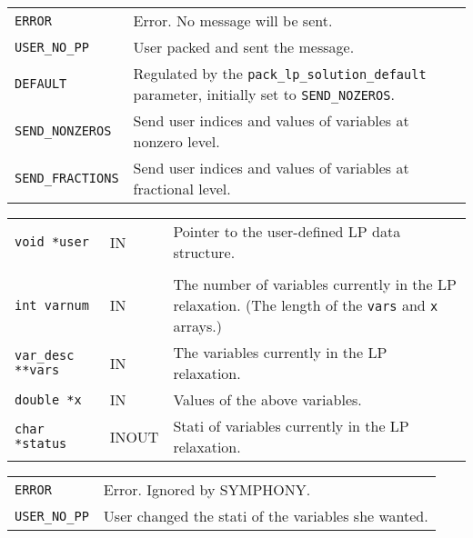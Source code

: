 \documentclass[twoside,11pt]{article}
\begin{document}
{\newpage
\clearpage
\samepage \begin{tabular}{lp{348.725pt}}
{\tt ERROR} & Error. No message will be sent. \\ 
{\tt USER\_NO\_PP} & User packed and sent the message. \\ 
{\tt DEFAULT} & Regulated by the {\tt pack\_lp\_solution\_default}
parameter, initially set to {\tt SEND\_NOZEROS}. \\ 
{\tt SEND\_NONZEROS} & Send user indices and values of variables
at nonzero level.\\ 
{\tt SEND\_FRACTIONS} & Send user indices and values of variables
at fractional level.\\ 
\end{tabular}
}

{\newpage
\clearpage
\samepage \begin{tabular}{llp{297.864pt}}
{\tt void *user} &  IN & Pointer to the user-defined LP data structure. \\ 
& & \\ 
{\tt int varnum} & IN & The number of variables currently in the LP
relaxation. (The length of the {\tt *vars} and {\tt x} arrays.) \\ 
{\tt var\_desc **vars} & IN & The variables currently in the LP relaxation.\\ 
{\tt double *x} & IN & Values of the above variables.\\ 
{\tt char *status} & INOUT & Stati of variables currently in the LP
relaxation. \\ 
\end{tabular}
}

{\newpage
\clearpage
\samepage \begin{tabular}{lp{371.195pt}}
{\tt ERROR} & Error. Ignored by {\sc SYMPHONY}. \\ 
{\tt USER\_NO\_PP} & User changed the stati of the variables she
wanted. \\ 
\end{tabular}
}
\end{document}
